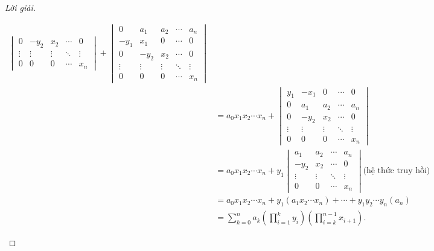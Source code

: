 \begin{proof}[Lời giải]
\begin{enumerate}[label = (\alph*)]
\begin{align*}
\begin{vmatrix}
                      0      & -y_{2} & x_{2}  & \cdots & 0      \\
                      \vdots & \vdots & \vdots & \ddots & \vdots \\
                      0      & 0      & 0      & \cdots & x_{n}
                  \end{vmatrix}
                  +
                  \begin{vmatrix}
                      0      & a_{1}  & a_{2}  & \cdots & a_{n}  \\
                      -y_{1} & x_{1}  & 0      & \cdots & 0      \\
                      0      & -y_{2} & x_{2}  & \cdots & 0      \\
                      \vdots & \vdots & \vdots & \ddots & \vdots \\
                      0      & 0      & 0      & \cdots & x_{n}
                  \end{vmatrix}                                                         \\
                   & =
                  a_{0}x_{1}x_{2}\cdots x_{n}
                  +
                  \begin{vmatrix}
                      y_{1}  & -x_{1} & 0      & \cdots & 0      \\
                      0      & a_{1}  & a_{2}  & \cdots & a_{n}  \\
                      0      & -y_{2} & x_{2}  & \cdots & 0      \\
                      \vdots & \vdots & \vdots & \ddots & \vdots \\
                      0      & 0      & 0      & \cdots & x_{n}
                  \end{vmatrix}                                                         \\
                   & =
                  a_{0}x_{1}x_{2}\cdots x_{n}
                  +
                  y_{1}
                  \begin{vmatrix}
                      a_{1}  & a_{2}  & \cdots & a_{n}  \\
                      -y_{2} & x_{2}  & \cdots & 0      \\
                      \vdots & \vdots & \ddots & \vdots \\
                      0      & 0      & \cdots & x_{n}
                  \end{vmatrix} \text{(hệ thức truy hồi)}                                                            \\
                   & = a_{0}x_{1}x_{2}\cdots x_{n}
                  + y_{1} (a_{1}x_{2}\cdots x_{n})
                  + \cdots
                  + y_{1}y_{2}\cdots y_{n} (a_{n})                                                                   \\
                   & = \sum^{n}_{k=0} a_{k}\left(\prod^{k}_{i=1}y_{i}\right)\left(\prod^{n-1}_{i=k}x_{i + 1}\right).
              \end{align*}
    \end{enumerate}
\end{proof}

